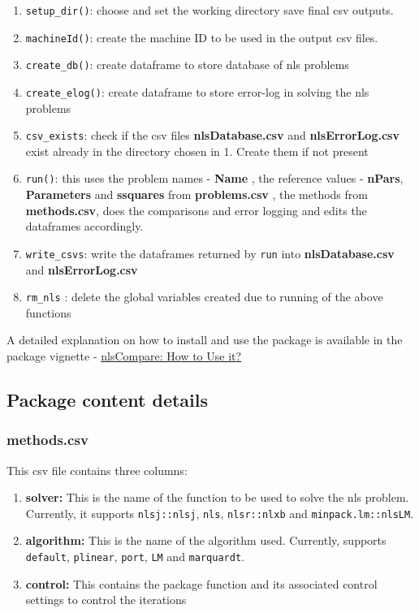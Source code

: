 \begin{enumerate}
\def\labelenumi{\arabic{enumi}.}
\tightlist
\item
  \texttt{setup\_dir()}: choose and set the working directory save final
  csv outputs.
\item
  \texttt{machineId()}: create the machine ID to be used in the output
  csv files.
\item
  \texttt{create\_db()}: create dataframe to store database of nls
  problems
\item
  \texttt{create\_elog()}: create dataframe to store error-log in
  solving the nls problems
\item
  \texttt{csv\_exists}: check if the csv files \textbf{nlsDatabase.csv}
  and \textbf{nlsErrorLog.csv} exist already in the directory chosen in
  1. Create them if not present
\item
  \texttt{run()}: this uses the problem names - \textbf{Name} , the
  reference values - \textbf{nPars}, \textbf{Parameters} and
  \textbf{ssquares} from \textbf{problems.csv} , the methods from
  \textbf{methods.csv}, does the comparisons and error logging and edits
  the dataframes accordingly.
\item
  \texttt{write\_csvs}: write the dataframes returned by \texttt{run}
  into \textbf{nlsDatabase.csv} and \textbf{nlsErrorLog.csv}
\item
  \texttt{rm\_nls} : delete the global variables created due to running
  of the above functions
\end{enumerate}

A detailed explanation on how to install and use the package is
available in the package vignette -
\href{https://github.com/ArkaB-DS/nlsCompare/blob/master/inst/docs/nlsCompare-Usage.pdf}{nlsCompare:
How to Use it?}

\hypertarget{package-content-details}{%
\subsection{Package content details}\label{package-content-details}}

\hypertarget{methods.csv}{%
\subsubsection{methods.csv}\label{methods.csv}}

This csv file contains three columns:

\begin{enumerate}
\def\labelenumi{\arabic{enumi}.}
\tightlist
\item
  \textbf{solver:} This is the name of the function to be used to solve
  the nls problem. Currently, it supports \texttt{nlsj::nlsj},
  \texttt{nls}, \texttt{nlsr::nlxb} and \texttt{minpack.lm::nlsLM}.
\item
  \textbf{algorithm:} This is the name of the algorithm used. Currently,
  supports \texttt{default}, \texttt{plinear}, \texttt{port},
  \texttt{LM} and \texttt{marquardt}.
\item
  \textbf{control:} This contains the package function and its
  associated control settings to control the iterations
\end{enumerate}

